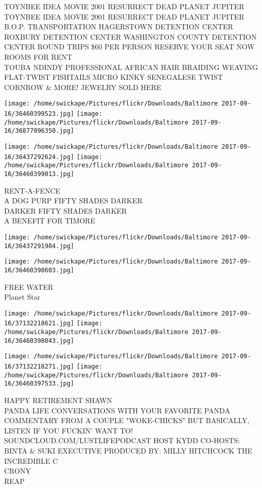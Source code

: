 \documentclass[10pt,letterpaper]{article}
\begin{document}
TOYNBEE IDEA MOVIE 2001 RESURRECT DEAD PLANET JUPITER TOYNBEE IDEA MOVIE 2001 RESURRECT DEAD PLANET JUPITER\\
B.O.P. TRANSPORTATION HAGERSTOWN DETENTION CENTER ROXBURY DETENTION CENTER WASHINGTON COUNTY DETENTION CENTER ROUND TRIPS \$60 PER PERSON RESERVE YOUR SEAT NOW\\
ROOMS FOR RENT\\
TOUBA NDINDY PROFESSIONAL AFRICAN HAIR BRAIDING WEAVING FLAT{-}TWIST FISHTAILS MICRO KINKY SENEGALESE TWIST CORNROW \& MORE!  JEWELRY SOLD HERE
\pagebreak

\texttt{[image: /home/swickape/Pictures/flickr/Downloads/Baltimore 2017-09-16/36460399523.jpg]}
\texttt{[image: /home/swickape/Pictures/flickr/Downloads/Baltimore 2017-09-16/36877096350.jpg]}

\texttt{[image: /home/swickape/Pictures/flickr/Downloads/Baltimore 2017-09-16/36437292624.jpg]}
\texttt{[image: /home/swickape/Pictures/flickr/Downloads/Baltimore 2017-09-16/36460399013.jpg]}

RENT{-}A{-}FENCE\\
A DOG PURP FIFTY SHADES DARKER\\
DARKER FIFTY SHADES DARKER\\
A BENEFIT FOR TIMORE
\pagebreak

\texttt{[image: /home/swickape/Pictures/flickr/Downloads/Baltimore 2017-09-16/36437291984.jpg]}

\vspace{0.25in}
\texttt{[image: /home/swickape/Pictures/flickr/Downloads/Baltimore 2017-09-16/36460398603.jpg]}

FREE WATER\\
Planet Star
\pagebreak

\texttt{[image: /home/swickape/Pictures/flickr/Downloads/Baltimore 2017-09-16/37132218621.jpg]}
\texttt{[image: /home/swickape/Pictures/flickr/Downloads/Baltimore 2017-09-16/36460398043.jpg]}

\texttt{[image: /home/swickape/Pictures/flickr/Downloads/Baltimore 2017-09-16/37132218271.jpg]}
\texttt{[image: /home/swickape/Pictures/flickr/Downloads/Baltimore 2017-09-16/36460397533.jpg]}

HAPPY RETIREMENT SHAWN\\
PANDA LIFE CONVERSATIONS WITH YOUR FAVORITE PANDA COMMENTARY FROM A COUPLE "WOKE{-}CHICKS" BUT BASICALLY, LISTEN IF YOU FUCKIN' WANT TO!  SOUNDCLOUD.COM/LUSTLIFEPODCAST HOST KYDD CO{-}HOSTS: BINTA \& SUKI EXECUTIVE PRODUCED BY: MILLY HITCHCOCK THE INCREDIBLE C\\
CRONY\\
REAP
\pagebreak
\end{document}
